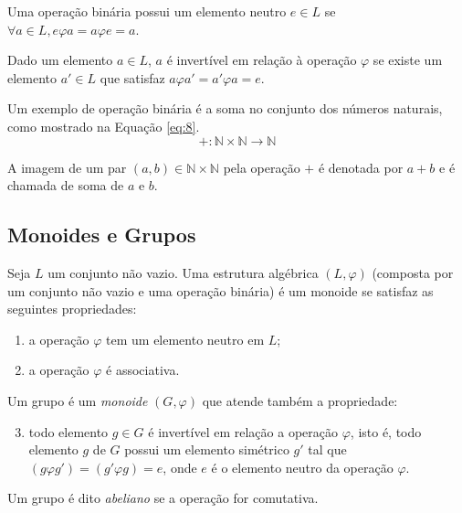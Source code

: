 Uma operação binária possui um elemento neutro \(e \in L\) se \( \forall a \in L, e \varphi a = a \varphi e = a\).

\par Dado um elemento \(a \in L\), \(a\) é invertível em relação à operação \( \varphi \) se existe  um elemento \(a' \in L\) que satisfaz \(a \varphi a' = a' \varphi a = e\). 

Um exemplo de operação binária é a soma no conjunto dos números naturais, como mostrado na Equação \ref{eq:8}.
\begin{equation}
  +: \mathbb{N} \times \mathbb{N} \to \mathbb{N} \label{eq:8}
\end{equation}

A imagem de um par \((a,b) \in \mathbb{N} \times \mathbb{N}\) pela operação \(+\) é denotada por \(a + b\) e é chamada de soma de \(a\) e \(b\).

%
%
\subsection{Monoides e Grupos}
Seja \(L\) um conjunto não vazio. Uma estrutura algébrica \((L, \varphi )\) (composta por um conjunto não vazio e uma operação binária) é um monoide se satisfaz as seguintes propriedades:

\begin{enumerate}
  \item a operação \( \varphi \) tem um elemento neutro em \(L\);
  \item a operação \( \varphi \) é associativa.
\end{enumerate}

Um grupo é um \textit{monoide} \((G,  \varphi)\) que atende também a propriedade:
\begin{enumerate}
\setcounter{enumi}{2}
\item todo elemento \(g \in G\) é invertível em relação a operação \(\varphi\), isto é, todo elemento \(g\) de \(G\) possui um elemento simétrico \(g'\) tal que \((g \varphi g') = (g' \varphi g) = e \), onde \(e\) é o elemento neutro da operação \(\varphi\).
\end{enumerate}
Um grupo é dito \textit{abeliano} se a operação for comutativa.

%
%
